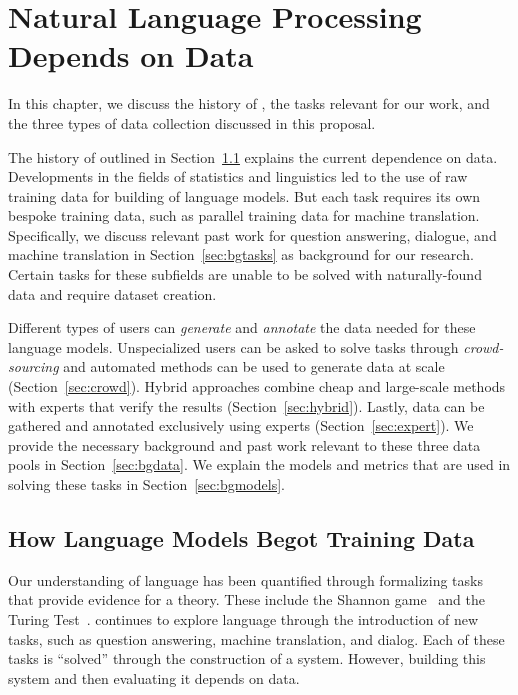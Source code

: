 \chapter{Natural Language Processing Depends on Data}
\label{ch:background}

In this chapter, we discuss the history of \nlp{}, the \nlp{} tasks relevant for our work, and the three types of data collection discussed in this proposal.

The history of \nlp{} outlined in Section~\ref{sec:bghistory} explains the current dependence on data.  
%
Developments in the fields of statistics and linguistics led to the use of raw training data for building of language models.
%
But each \nlp{} task requires its own bespoke training data, such as parallel training data for machine translation.    
%
%
Specifically, we discuss relevant past work for question answering, dialogue, and machine translation in Section~\ref{sec:bgtasks} as background for our research.
%
Certain tasks for these subfields are unable to be solved with naturally-found data and require dataset creation.  

Different types of users can \textit{generate} and \textit{annotate} the data needed for these language models.  
%
Unspecialized users can be asked to solve tasks through \textit{crowd-sourcing} and automated methods can be used to generate data at scale (Section~\ref{sec:crowd}).  
%
Hybrid approaches combine cheap and large-scale methods with experts that verify the results (Section~\ref{sec:hybrid}).
%
Lastly, data can be gathered and annotated exclusively using experts (Section~\ref{sec:expert}).  
%
We provide the necessary background and past work relevant to these three data pools in Section~\ref{sec:bgdata}.
%
We explain the models and metrics that are used in solving these tasks in Section~\ref{sec:bgmodels}.  


\section{How Language Models Begot Training Data}
\label{sec:bghistory}

Our understanding of language has been quantified through formalizing tasks that provide evidence for a theory.  
%
These include the Shannon game~\citep{shannon1949mathematical} and the Turing Test~\citep{turing1950computing}.
%
\nlp{} continues to explore language through the introduction of new tasks, such as question answering, machine translation, and dialog.
%
Each of these tasks is ``solved'' through the construction of a system.  
%
However, building this system and then evaluating it depends on data.  

